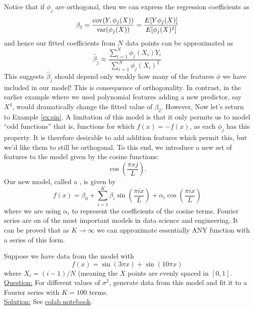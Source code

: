 Notice that if $\phi_j$ are orthogonal, then we can express the regression coefficients as
\begin{equation*}
\beta_j = \frac{{\rm cov}(Y,\phi_j(X))}{{\rm var}(\phi_j(X))} =  \frac{E[Y\phi_j(X)]}{E[\phi_j(X)^2]}
\end{equation*}
and hence our fitted coefficients from $N$ data points can be approximated as
\begin{equation}\label{eq:fourier_coef}
\hat{\beta}_j \approx \frac{\sum_{i=1}^N\phi_j(X_i)Y_i}{\sum_{i=1}^N\phi_j(X_i)^2}
\end{equation}
This suggests $\hat{\beta}_j$ should depend only weakly how many of the features $\phi$ we have included in our model! This is consequence of orthogonality. In contrast,  in the earlier example where we used polynomial features adding a new predictor, say $X^4$, would dramatically change the fitted value of $\beta_2$. However, 
Now let's return to Example \ref{ex:sin}. A limitation of this model is that it only permits us to model ``odd functions'' that is, functions for which $f(x) = -f(x)$, as each $\phi_j$ has this property. It is therefore desirable to add addition features which permit this, but we'd like them to still be orthogonal. To this end, we introduce a new set of features to the model given by the cosine functions:
\begin{equation*}
 \cos\left(\frac{\pi x j}{L} \right).
\end{equation*} 
Our new model, called a , is given by 
\begin{equation*}
f(x) = \beta_0 + \sum_{i=1}^K\beta_i\sin\left(\frac{\pi i x }{L} \right) + \alpha_i \cos\left(\frac{\pi i x }{L} \right)
\end{equation*}
where we are using $\alpha_i$ to represent the coefficients of the cosine terms. Fourier series are on of the most important models in data science and engineering. It can be proved that as $K \to \infty$ we can approximate essentially ANY function with a series of this form.


\begin{example}\label{ex:fourier}
Suppose we have data from the model with 
\begin{equation*}
f(x) = \sin(3\pi x) + \sin (10\pi x)
\end{equation*}
where $X_i = (i-1)/N$ (meaning the $X$ points are evenly spaced in $[0,1]$. \\



\noindent
\underline{Question:} For different values of $\sigma^2$, generate data from this model and fit it to a Fourier series with $K=100$ terms. \\



\noindent
\underline{Solution:} See \href{https://colab.research.google.com/drive/1EYcMviowfsnsVe7vsUKlyzkNsddUiTau?usp=sharing}{colab notebook}. \\


\end{example} 

